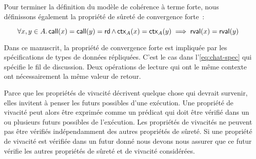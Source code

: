 Pour terminer la définition du modèle de cohérence à terme forte, nous définissons également la propriété de sûreté de convergence forte~:

\begin{equation}
    \forall x, y \in A \ldotp \operatorname{\mathsf{call}}(x) = \operatorname{\mathsf{call}}(y) = \operatorname{\mathsf{rd}} \land \operatorname{\mathsf{ctx}}_A(x) = \operatorname{\mathsf{ctx}}_A(y) \implies \operatorname{\mathsf{rval}}(x) = \operatorname{\mathsf{rval}}(y)
\end{equation}

Dans ce manuscrit, la propriété de convergence forte est impliquée par les spécifications de types de données répliquées.
C'est le cas dans l'\autoref{eq:chat-spec} qui spécifie le fil de discussion.
Deux opérations de lecture qui ont le même contexte ont nécessairement la même valeur de retour.

Parce que les propriétés de vivacité décrivent quelque chose qui devrait survenir, elles invitent à penser les futurs possibles d'une exécution.
Une propriété de vivacité peut alors être exprimée comme un prédicat qui doit être vérifié dans un ou plusieurs futurs possibles de l'exécution.
Les propriétés de vivacités ne peuvent pas être vérifiés indépendamment des autres propriétés de sûreté.
Si une propriété de vivacité est vérifiée dans un futur donné nous devons nous assurer que ce futur vérifie les autres propriétés de sûreté et de vivacité considérées.



